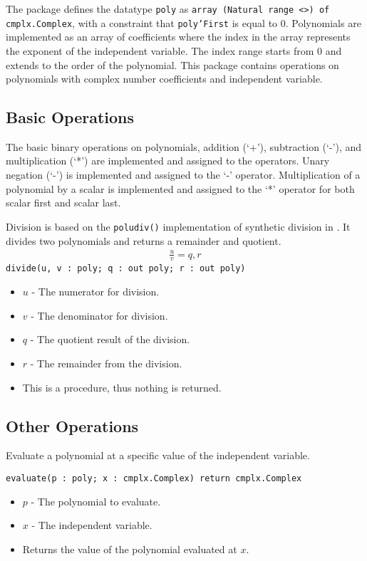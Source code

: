 \documentclass[10pt, openany]{book}
\newcommand{\function}[1]{\texttt{#1}}
\newcommand{\datatype}[1]{\texttt{#1}}
\begin{document}
The package defines the datatype \datatype{poly} as \datatype{array (Natural range  <>) of cmplx.Complex}, with a constraint that \datatype{poly'First} is equal to 0.  Polynomials are implemented as an array of coefficients where the index in the array represents the exponent of the independent variable.  The index range starts from 0 and extends to the order of the polynomial.  This package contains operations on polynomials with complex number coefficients and independent variable.

\subsection{Basic Operations}
The basic binary operations on polynomials, addition (`+'), subtraction (`-'), and multiplication (`*') are implemented and assigned to the operators.  Unary negation (`-') is implemented and assigned to the `-' operator.  Multiplication of a polynomial by a scalar is implemented and assigned to the `*' operator for both scalar first and scalar last.

Division is based on the \function{poludiv()} implementation of synthetic division in \cite{NR-C}.  It divides two polynomials and returns a remainder and quotient.
\begin{align*}
  \frac{u}{v} = q, r
\end{align*}
\function{divide(u, v : poly; q : out poly; r : out poly)}
\begin{itemize}
  \item $u$ - The numerator for division.
  \item $v$ - The denominator for division.
  \item $q$ - The quotient result of the division.
  \item $r$ - The remainder from the division.
  \item This is a procedure, thus nothing is returned.
\end{itemize}

\subsection{Other Operations}

Evaluate a polynomial at a specific value of the independent variable.

\function{evaluate(p : poly; x : cmplx.Complex) return cmplx.Complex}
\begin{itemize}
  \item $p$ - The polynomial to evaluate.
  \item $x$ - The independent variable.
  \item Returns the value of the polynomial evaluated at $x$.
\end{itemize}
\end{document}
